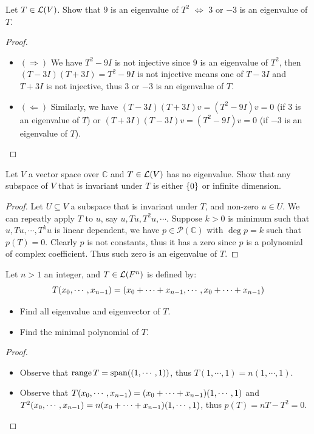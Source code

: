 \documentclass[../main.tex]{subfiles}
\begin{document}
\begin{exercise}
  Let $T \in \LT(V)$. Show that $9$ is an eigenvalue of $T^2$ $\iff$ $3$ or $-3$ is an eigenvalue of $T$.
\end{exercise}
\begin{proof}
  ~
  \begin{itemize}
    \item $(\Rightarrow)$ We have $T^2 - 9I$ is not injective since $9$ is an eigenvalue of $T^2$,
          then $(T - 3I)(T + 3I) = T^2 - 9I$ is not injective means one of $T - 3I$ and $T + 3I$
          is not injective, thus $3$ or $-3$ is an eigenvalue of $T$.
    \item $(\Leftarrow)$ Similarly, we have $(T - 3I)(T + 3I)v = (T^2 - 9I)v = 0$ (if $3$ is an eigenvalue of $T$)
          or $(T + 3I)(T - 3I)v = (T^2 - 9I)v = 0$ (if $-3$ is an eigenvalue of $T$).
  \end{itemize}
\end{proof}

\begin{exercise}
  Let $V$ a vector space over $\mathbb{C}$ and $T \in \LT(V)$ has no eigenvalue.
  Show that any subspace of $V$ that is invariant under $T$ is either $\0$
  or infinite dimension.
\end{exercise}
\begin{proof}
  Let $U \subseteq V$ a subspace that is invariant under $T$, and non-zero $u \in U$.
  We can repeatly apply $T$ to $u$, say $u, Tu, T^2u, \cdots$. Suppose $k > 0$ is minimum such that
  $u, Tu, \cdots, T^ku$ is linear dependent, we have $p \in \mathcal{P}(\mathbb{C})$ with $\deg p = k$ such that $p(T) = 0$.
  Clearly $p$ is not constants, thus it has a zero since $p$ is a polynomial of complex coefficient.
  Thus such zero is an eigenvalue of $T$.
\end{proof}

\begin{exercise}
  Let $n > 1$ an integer, and $T \in \LT(F^n)$ is defined by:
  \[
  T(\join{x}{n - 1}) = (\join[+]{x}{n - 1}, \cdots, \join[+]{x}{n - 1})
  \]
  \begin{itemize}
    \item Find all eigenvalue and eigenvector of $T$.
    \item Find the minimal polynomial of $T$.
  \end{itemize}
\end{exercise}
\begin{proof}
  ~
  \begin{itemize}
    \item Observe that $\rangev T = \spanv((1, \cdots, 1))$, thus $T(1, \cdots, 1) = n(1, \cdots, 1)$.
    \item Observe that $T(\join{x}{n - 1}) = (\join[+]{x}{n - 1})(1, \cdots, 1)$ and \\
          $T^2(\join{x}{n - 1}) = n(\join[+]{x}{n - 1})(1, \cdots, 1)$,
          thus $p(T) = nT - T^2 = 0$.
  \end{itemize}
\end{proof}
\end{document}
